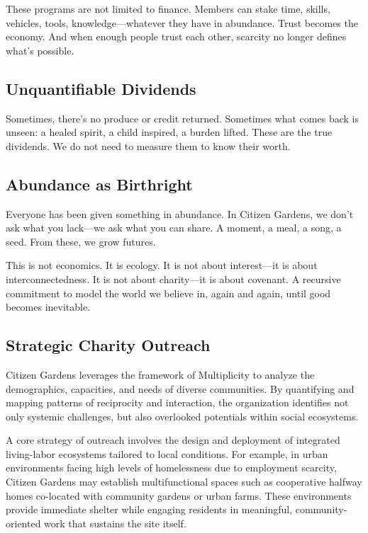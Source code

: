 \documentclass[12pt]{article}
\begin{document}
These programs are not limited to finance. Members can stake time, skills, vehicles, tools, knowledge—whatever they have in abundance. Trust becomes the economy. And when enough people trust each other, scarcity no longer defines what’s possible.

\subsection{Unquantifiable Dividends}

Sometimes, there's no produce or credit returned. Sometimes what comes back is unseen: a healed spirit, a child inspired, a burden lifted. These are the true dividends. We do not need to measure them to know their worth.

\subsection{Abundance as Birthright}

Everyone has been given something in abundance. In Citizen Gardens, we don't ask what you lack—we ask what you can share. A moment, a meal, a song, a seed. From these, we grow futures.

This is not economics. It is ecology. It is not about interest—it is about interconnectedness. It is not about charity—it is about covenant. A recursive commitment to model the world we believe in, again and again, until good becomes inevitable.

\subsection{Strategic Charity Outreach}

Citizen Gardens leverages the framework of Multiplicity to analyze the demographics, capacities, and needs of diverse communities. By quantifying and mapping patterns of reciprocity and interaction, the organization identifies not only systemic challenges, but also overlooked potentials within social ecosystems.

A core strategy of outreach involves the design and deployment of integrated living-labor ecosystems tailored to local conditions. For example, in urban environments facing high levels of homelessness due to employment scarcity, Citizen Gardens may establish multifunctional spaces such as cooperative halfway homes co-located with community gardens or urban farms. These environments provide immediate shelter while engaging residents in meaningful, community-oriented work that sustains the site itself.
\end{document}
